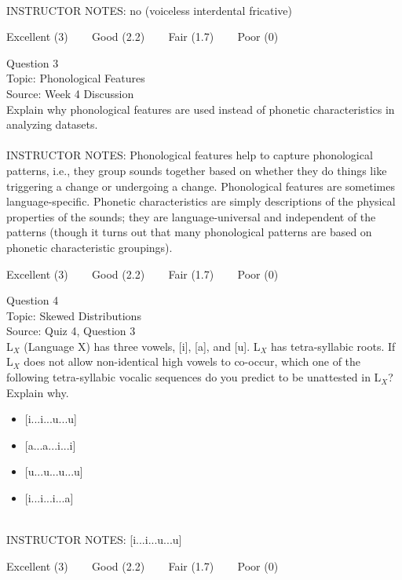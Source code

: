 \documentclass[12pt]{article}
\begin{document}
~\\
INSTRUCTOR NOTES: no (voiceless interdental fricative)


\vfill
Excellent (3) ~~~ Good (2.2) ~~~ Fair (1.7) ~~~ Poor (0)
\newpage

{\large Question 3}\\

Topic: Phonological Features\\
Source: Week 4 Discussion\\

Explain why phonological features are used instead of phonetic characteristics in analyzing datasets.\\


~\\
INSTRUCTOR NOTES: Phonological features help to capture phonological patterns, i.e., they group sounds together based on whether they do things like triggering a change or undergoing a change. Phonological features are sometimes language-specific. Phonetic characteristics are simply descriptions of the physical properties of the sounds; they are language-universal and independent of the patterns (though it turns out that many phonological patterns are based on phonetic characteristic groupings).


\vfill
Excellent (3) ~~~ Good (2.2) ~~~ Fair (1.7) ~~~ Poor (0)
\newpage

{\large Question 4}\\

Topic: Skewed Distributions\\
Source: Quiz 4, Question 3\\

L$_X$ (Language X) has three vowels, [i], [a], and [u]. L$_X$ has tetra-syllabic roots. If L$_X$ does not allow non-identical high vowels to co-occur, which one of the following tetra-syllabic vocalic sequences do you predict to be unattested in L$_X$? Explain why.\\

\begin{itemize} \item {[i...i...u...u]} \item {[a...a...i...i]} \item {[u...u...u...u]} \item {[i...i...i...a]} \end{itemize}


~\\
INSTRUCTOR NOTES: [i...i...u...u]


\vfill
Excellent (3) ~~~ Good (2.2) ~~~ Fair (1.7) ~~~ Poor (0)
\newpage
\end{document}
